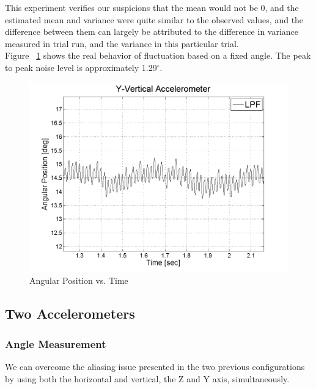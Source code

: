 \documentclass{article}
\theoremstyle{plain}
\theoremstyle{definition}
\theoremstyle{remark}
\begin{document}
This experiment verifies our suspicions that the mean would not be 0, and the estimated mean and variance were quite similar to the observed values, and the difference between them can largely be attributed to the difference in variance measured in trial run, and the variance in this particular trial. \\

Figure ~\ref{Y_Peak2peak} shows the real behavior of fluctuation based on a fixed angle. The peak to peak noise level is approximately 1.29$^{\circ}$.\\

\begin{figure}[hbt]
\begin{center}
\includegraphics[width = 13cm]{Y_Peak2peak.png}
\caption{Angular Position vs. Time}
\label{Y_Peak2peak}
\end{center}
\end{figure}

\subsection{Two Accelerometers}

\subsubsection{Angle Measurement}

We can overcome the aliasing issue  presented in the two previous configurations by using both the horizontal and vertical, the Z and Y axis, simultaneously.  
\end{document}
